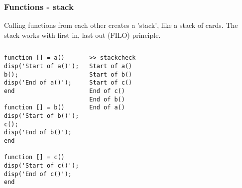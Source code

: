 \begin{frame}[fragile]
 \frametitle{Functions - stack}
 Calling functions from each other creates a 'stack', like a stack of cards. The stack works with first in, last out (FILO) principle.
 \begin{columns}
    \begin{lstlisting}
function [] = a()
disp('Start of a()');
b();
disp('End of a()');
end

function [] = b()
disp('Start of b()');
c();
disp('End of b()');
end

function [] = c()
disp('Start of c()');
disp('End of c()');
end
    \end{lstlisting}
    \begin{lstlisting}
>> stackcheck
Start of a()
Start of b()
Start of c()
End of c()
End of b()
End of a()
    \end{lstlisting}
 \end{columns}
\end{frame}



